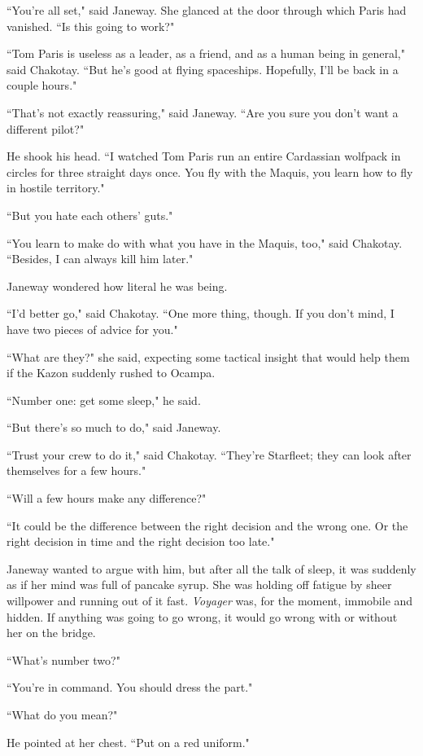 \documentclass[twoside,letterpaper,12pt]{memoir}
\begin{document}
``You're all set," said Janeway. She glanced at the door through which Paris had vanished. ``Is this going to work?"

``Tom Paris is useless as a leader, as a friend, and as a human being in general," said Chakotay. ``But he's good at flying spaceships. Hopefully, I'll be back in a couple hours."

``That's not exactly reassuring," said Janeway. ``Are you sure you don't want a different pilot?"

He shook his head. ``I watched Tom Paris run an entire Cardassian wolfpack in circles for three straight days once. You fly with the Maquis, you learn how to fly in hostile territory."

``But you hate each others' guts."

``You learn to make do with what you have in the Maquis, too," said Chakotay. ``Besides, I can always kill him later."

Janeway wondered how literal he was being.

``I'd better go," said Chakotay. ``One more thing, though. If you don't mind, I have two pieces of advice for you."

``What are they?" she said, expecting some tactical insight that would help them if the Kazon suddenly rushed to Ocampa.

``Number one: get some sleep," he said.

``But there's so much to do," said Janeway.

``Trust your crew to do it," said Chakotay. ``They're Starfleet; they can look after themselves for a few hours."

``Will a few hours make any difference?"

``It could be the difference between the right decision and the wrong one. Or the right decision in time and the right decision too late."

Janeway wanted to argue with him, but after all the talk of sleep, it was suddenly as if her mind was full of pancake syrup. She was holding off fatigue by sheer willpower and running out of it fast. \textit{Voyager} was, for the moment, immobile and hidden. If anything was going to go wrong, it would go wrong with or without her on the bridge.

``What's number two?"

``You're in command. You should dress the part."

``What do you mean?"

He pointed at her chest. ``Put on a red uniform."
\end{document}

